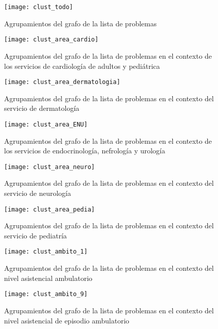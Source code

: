 \begin{figure}[ht]
\caption{Agrupamientos del grafo de la lista de problemas}
\label{fig:clust_todo}
\centering
\texttt{[image: clust\_todo]}
\end{figure}

\begin{figure}[ht]
\caption{Agrupamientos del grafo de la lista de problemas en el contexto de los servicios de cardiología de adultos y pediátrica}
\label{fig:clust_area_cardio}
\centering
\texttt{[image: clust\_area\_cardio]}
\end{figure}

\begin{figure}[ht]
\caption{Agrupamientos del grafo de la lista de problemas en el contexto del servicio de dermatología}
\label{fig:clust_area_dermatologia}
\centering
\texttt{[image: clust\_area\_dermatologia]}
\end{figure}

\begin{figure}[ht]
\caption{Agrupamientos del grafo de la lista de problemas en el contexto de los servicios de endocrinología, nefrología y urología}
\label{fig:clust_area_ENU}
\centering
\texttt{[image: clust\_area\_ENU]}
\end{figure}


\begin{figure}[ht]
\caption{Agrupamientos del grafo de la lista de problemas en el contexto del servicio de neurología }
\label{fig:clust_area_neuro}
\centering
\texttt{[image: clust\_area\_neuro]}
\end{figure}

\begin{figure}[ht]
\caption{Agrupamientos del grafo de la lista de problemas en el contexto del servicio de pediatría }
\label{fig:clust_area_pedia}
\centering
\texttt{[image: clust\_area\_pedia]}
\end{figure}


\begin{figure}[ht]
\caption{Agrupamientos del grafo de la lista de problemas en el contexto del nivel asistencial ambulatorio }
\label{fig:clust_ambito_ambulatorio}
\centering
\texttt{[image: clust\_ambito\_1]}
\end{figure}

\begin{figure}[ht]
\caption{Agrupamientos del grafo de la lista de problemas en el contexto del nivel asistencial de episodio ambulatorio }
\label{fig:clust_ambito_epi_ambulatorio}
\centering
\texttt{[image: clust\_ambito\_9]}
\end{figure}


